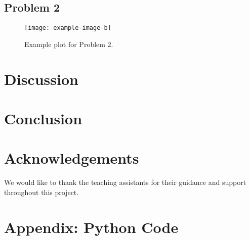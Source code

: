 \documentclass[a4paper,12pt]{report}
\begin{document}
\subsection{Problem 2}
\lipsum[8]
\begin{figure}[H]
    \centering
    \texttt{[image: example-image-b]}
    \caption{Example plot for Problem 2\cite{nocedalwright2006numerical}.}
    \label{fig:problem2}
\end{figure}

\section{Discussion}
\lipsum[9]

\section{Conclusion}
\lipsum[10]

\section*{Acknowledgements}
We would like to thank the teaching assistants for their guidance and support throughout this project.




\appendix
\section{Appendix: Python Code}
\inputminted{python}{code/code.py}
\end{document}

